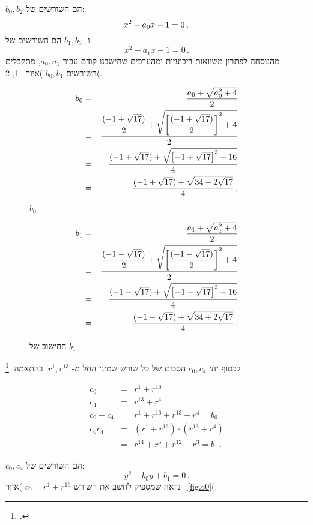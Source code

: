 $b_0,b_2$ 
הם השורשים של:
\[
x^2-a_0x-1= 0\,,\\
\]
ו-%
$b_1,b_3$
הם השורשים של:
\[
x^2-a_1x-1 =0\,.
\]
מהנוסחה לפתרון משוואות ריבועיות ומהערכים שחישבנו קודם עבור 
$a_0,a_1$,
מתקבלים השורשים
$b_0,b_1$
)איור~%
\ref{fig.b0}, \ref{fig.b1}(.
\begin{figure}[tb]

\begin{eqnarray*}
b_0&=&\displaystyle\frac{a_0+\sqrt{a_0^2+4}}{2}\\
&=&\displaystyle\frac{
     \displaystyle\frac{(-1+\sqrt{17})}{2} + 
     \sqrt{\left[\displaystyle\frac{(-1+\sqrt{17})}{2}\right]^2+4}
   }{2}\\
&=&\displaystyle\frac{
     (-1+\sqrt{17}) + 
     \sqrt{\left[-1+\sqrt{17}\right]^2+16}
   }{4}\\
&=&\displaystyle\frac{
     (-1+\sqrt{17}) + 
     \sqrt{34-2\sqrt{17}}
   }{4}\,,
\end{eqnarray*}%
\caption{ $b_0$}\label{fig.b0}
\end{figure}
\begin{figure}

\begin{eqnarray*}
b_1&=&\displaystyle\frac{a_1+\sqrt{a_1^2+4}}{2}\\
&=&\displaystyle\frac{
     \displaystyle\frac{(-1-\sqrt{17})}{2} + 
     \sqrt{\left[\displaystyle\frac{(-1-\sqrt{17})}{2}\right]^2+4}
   }{2}\\
&=&\displaystyle\frac{
     (-1-\sqrt{17}) + 
     \sqrt{\left[-1-\sqrt{17}\right]^2+16}
   }{4}\\
&=&\displaystyle\frac{
     (-1-\sqrt{17}) + 
     \sqrt{34+2\sqrt{17}}
   }{4}\,.
\end{eqnarray*}
\caption{החישוב של $b_1$}\label{fig.b1}
\end{figure}
לבסוף יהי
$c_0,c_4$ 
הסכום של כל שורש שמיני החל מ-%
$r^1,r^{13}$,
בהתאמה:%
\footnote{.}

\begin{eqnarray*}
c_0&=&r^1+r^{16}\\
c_4&=&r^{13}+r^4\\
c_0+c_4&=&r^1+r^{16}+r^{13}+r^4=b_0\\
c_0c_4&=&(r^1+r^{16})\cdot(r^{13}+r^4)\\
&=&r^{14}+r^5+r^{12}+r^3=b_1\,.
\end{eqnarray*}

$c_0,c_4$
הם השורשים של:
\[
y^2-b_0y+b_1=0\,.
\]
נראה שמספיק לחשב את השורש
$c_0=r^1+r^{16}$
)איור~
\ref{fig.c0}(.


